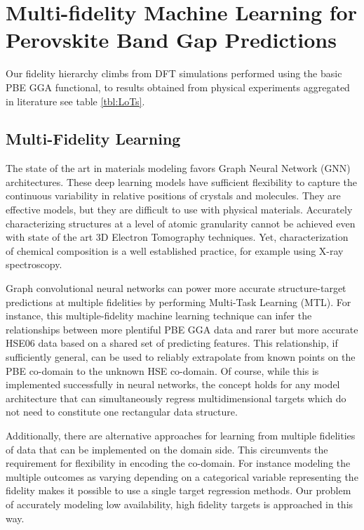 \chapter{Multi-fidelity Machine Learning for Perovskite Band Gap Predictions}
\label{sec:org550a7b4}
Our fidelity hierarchy climbs from DFT simulations performed using the basic PBE GGA functional, to results obtained from physical experiments aggregated in literature see table \ref{tbl:LoTs}.
\autocite{almora-2020-devic-perfor,kim-2014-cdses-nanow,swanson-2017-co-sublim}

\section{Multi-Fidelity Learning}
\label{sec:orgfc60d01}
The state of the art in materials modeling favors Graph Neural Network (GNN) architectures.
\autocite{chen-2019-graph-networ,choudhary-2021-atomis-line,xie-2018-cryst-graph}
These deep learning models have sufficient flexibility to capture the continuous variability in relative positions of crystals and molecules.
They are effective models, but they are difficult to use with physical materials.
Accurately characterizing structures at a level of atomic granularity cannot be achieved even with state of the art 3D Electron Tomography techniques.
\autocite{ercius-2015-elect-tomog}
Yet, characterization of chemical composition is a well established practice, for example using X-ray spectroscopy.

Graph convolutional neural networks can power more accurate structure-target predictions at multiple fidelities \autocite{chen-2020-multi-fidel} by performing Multi-Task Learning (MTL).
For instance, this multiple-fidelity machine learning technique can infer the relationships between more plentiful PBE GGA data and rarer but more accurate HSE06 data based on a shared set of predicting features.
This relationship, if sufficiently general, can be used to reliably extrapolate from known points on the PBE co-domain to the unknown HSE co-domain.
Of course, while this is implemented successfully in neural networks, the concept holds for any model architecture that can simultaneously regress multidimensional targets which do not need to constitute one rectangular data structure.

Additionally, there are alternative approaches for learning from multiple fidelities of data that can be implemented on the domain side.
This circumvents the requirement for flexibility in encoding the co-domain.
For instance modeling the multiple outcomes as varying depending on a categorical variable representing the fidelity makes it possible to use a single target regression methods.
Our problem of accurately modeling low availability, high fidelity targets is approached in this way.

